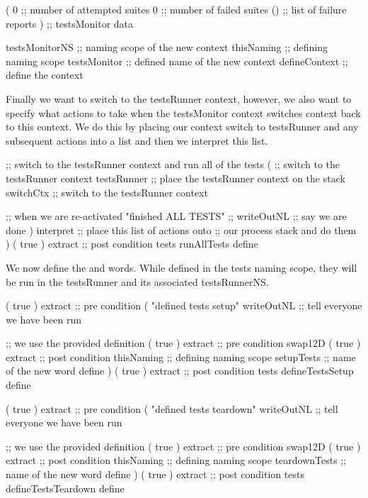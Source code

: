   (
    0             ;; number of attempted suites
    0             ;; number of failed suites
    ()            ;; list of failure reports
  )               ;; testsMonitor data
  
  testsMonitorNS  ;; naming scope of the new context
  thisNaming      ;; defining naming scope
  testsMonitor    ;; defined name of the new context
  defineContext   ;; define the context
\stopJoylolCode

Finally we want to switch to the testsRunner context, however, we also 
want to specify what actions to take when the testsMonitor context 
switches context back to this context. We do this by placing our context 
switch to testsRunner and any subsequent actions into a list and then we 
interpret this list. 

\startJoylolCode
  ;; switch to the testsRunner context and run all of the tests
  (
    ;; switch to the testsRunner context
    testsRunner ;; place the testsRunner context on the stack
    switchCtx   ;; switch to the testsRunner context
    
    ;; when we are re-activated
    "finished ALL TESTS"  ;;
    writeOutNL            ;; say we are done
  )
  interpret     ;; place this list of actions onto
                ;; our process stack and do them
)
( { true } ) extract ;; post condition
tests
runAllTests
define
\stopJoylolCode

We now define the  and  
words. While defined in the tests naming scope, they will be run in the 
testsRunner and its associated testsRunnerNS. 

\startJoylolCode
( { true } ) extract ;; pre condition
(
  "defined tests setup"
  writeOutNL  ;; tell everyone we have been run
  
              ;; we use the provided definition
  ( { true } ) extract ;; pre condition
  swap12D
  ( { true } ) extract ;; post condition
  thisNaming  ;; defining naming scope
  setupTests  ;; name of the new word
  define
)
( { true } ) extract ;; post condition
tests
defineTestsSetup
define
\stopJoylolCode

\startJoylolCode
( { true } ) extract ;; pre condition
(
  "defined tests teardown"
  writeOutNL    ;; tell everyone we have been run
  
                ;; we use the provided definition
  ( { true } ) extract ;; pre condition
  swap12D
  ( { true } ) extract ;; post condition
  thisNaming    ;; defining naming scope
  teardownTests ;; name of the new word
  define
)
( { true } ) extract ;; post condition
tests
defineTestsTeardown
define
\stopJoylolCode

